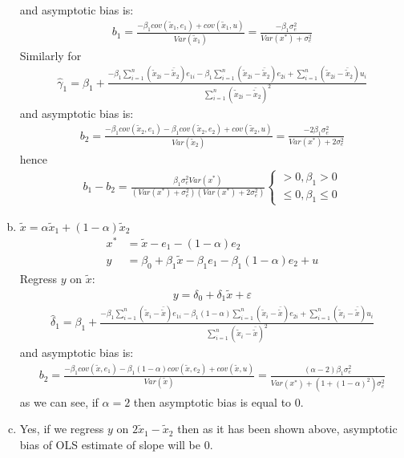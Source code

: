 \documentclass[a4paper]{article}
\newcommand{\summa}{\sum_{i=1}^n}
\begin{document}
\begin{enumerate}[(a)]
\begin{align*}
	\end{align*}
	and asymptotic bias is:
	\begin{align*}
	b_1 = \frac{-\beta_1 cov(\tilde{x}_1, e_1) + cov(\tilde{x}_1, u)}{Var(\tilde{x}_1)} = \frac{-\beta_1 \sigma^2_e}{Var(x^*) + \sigma^2_e}
	\end{align*}
	Similarly for 
	\begin{align*}
	\hat{\gamma}_1 = \beta_1 + \frac{-\beta_1 \summa (\tilde{x}_{2i} - \bar{\tilde{x}}_2)e_{1i} -\beta_1 \summa (\tilde{x}_{2i} - \bar{\tilde{x}}_2)e_{2i} + \summa(\tilde{x}_{2i} - \bar{\tilde{x}}_2)u_{i} }{\summa (\tilde{x}_{2i} - \bar{\tilde{x}}_2)^2}
	\end{align*}
	and asymptotic bias is:
	\begin{align*}
	b_2 = \frac{-\beta_1 cov(\tilde{x}_2, e_1) -\beta_1 cov(\tilde{x}_2, e_2)+ cov(\tilde{x}_2, u)}{Var(\tilde{x}_2)} = \frac{-2\beta_1 \sigma^2_e}{Var(x^*) + 2\sigma^2_e}
\end{align*}
hence
\begin{align*}
b_1 - b_2 = \frac{\beta_1\sigma^2_eVar(x^*)}{(Var(x^*) + \sigma^2_e)(Var(x^*) + 2\sigma^2_e)}\begin{cases}
>0, \beta_1 > 0\\
\le 0, \beta_1 \le 0
\end{cases}
\end{align*}
\item $\tilde{x} = \alpha \tilde{x}_1 + (1 - \alpha)\tilde{x}_2$
\begin{align*}
x^* &= \tilde{x} - e_1 - (1 - \alpha)e_2\\
y &= \beta_0 + \beta_1 \tilde{x} - \beta_1 e_1 - \beta_1(1 - \alpha)e_2 + u
\end{align*}
Regress $y$ on $\tilde{x}$:
\begin{align*}
y = \delta_0 + \delta_1 \tilde{x} + \varepsilon
\end{align*}
\begin{align*}
\hat{\delta}_1 = \beta_1 + \frac{-\beta_1 \summa (\tilde{x}_{i} - \bar{\tilde{x}})e_{1i} -\beta_1(1 - \alpha) \summa (\tilde{x}_{i} - \bar{\tilde{x}})e_{2i} + \summa(\tilde{x}_{i} - \bar{\tilde{x}})u_{i} }{\summa (\tilde{x}_{i} - \bar{\tilde{x}})^2}
\end{align*}
and asymptotic bias is:
\begin{align*}
b_2 = \frac{-\beta_1 cov(\tilde{x}, e_1) -\beta_1(1 - \alpha) cov(\tilde{x}, e_2)+ cov(\tilde{x}, u)}{Var(\tilde{x})} = \frac{(\alpha - 2)\beta_1 \sigma^2_e}{Var(x^*) + (1 + (1 - \alpha)^2)\sigma^2_e}
\end{align*}
as we can see, if $\alpha = 2$ then asymptotic bias is equal to 0.
\item Yes, if we regress $y$ on $2\tilde{x}_1 - \tilde{x}_2$ then as it has been shown above, asymptotic bias of OLS estimate of slope will be 0.
\end{enumerate}
\end{document}
